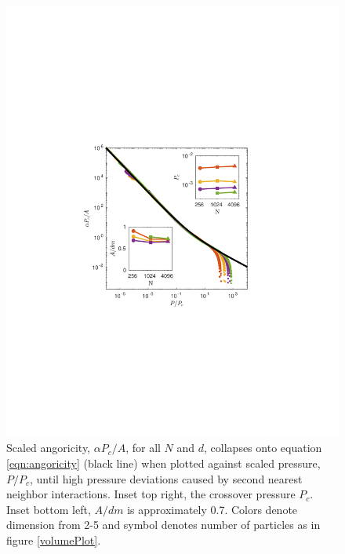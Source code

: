 \begin{figure}[t!]
\centering
\includegraphics[width=\columnwidth, trim=143 240 165 253, clip]{forceVolumeEntropyPaper/angoricityInset.pdf}
\caption{Scaled angoricity, $\alpha P_c/A$, for all $N$ and $d$, collapses onto equation \ref{eqn:angoricity} (black line) when plotted against scaled pressure, $P/P_c$, until high pressure deviations caused by second nearest neighbor interactions. Inset top right, the crossover pressure $P_c$. Inset bottom left, $A/dm$ is approximately 0.7. Colors denote dimension from 2-5 and symbol denotes number of particles as in figure \ref{volumePlot}.
}
\label{angoricityPlot}
\end{figure}

